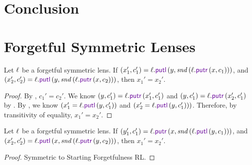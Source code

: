 \documentclass[acmsmall,screen,anonymous]{acmart}
\begin{document}

\section{Conclusion}
\label{sec:conc}

\begin{acks}
\end{acks}

\ifanon\else
\fi





\appendix

\ifappendices

\onecolumn

\section{Forgetful Symmetric Lenses}

\begin{property}
  \label{prop:forget-rl}
  Let $\mathit{\ell}$ be a forgetful symmetric lens.  If $(x_1',c_1') = \Lens.\PutL \App
  (y,\Snd \App (\Lens.\PutR \App (x,c_1)))$, and
  $(x_2',c_2') = \Lens.\PutL \App
  (y,\Snd \App (\Lens.\PutR \App (x,c_2)))$, then $x_1' = x_2'$.
\end{property}
\begin{proof}
  By \ForgetfulRL, $c_1' = c_2'$. We know $(y,c_1') = \Lens.\PutR \App
  (x_1',c_1')$ and $(y,c_1') = \Lens.\PutR \App (x_2',c_1')$ by \PutLR. By
  \PutRL, we know $(x_1' = \Lens.\PutL \App (y,c_1'))$ and $(x_2' = \Lens.\PutL
  \App (y,c_1')))$. Therefore, by transitivity of equality, $x_1' = x_2'$.
\end{proof}

\begin{property}
  \label{prop:forget-lr}
  Let $\mathit{\ell}$ be a forgetful symmetric lens.  If $(y_1',c_1') = \Lens.\PutR \App
  (x,\Snd \App (\Lens.\PutL \App (y,c_1)))$, and
  $(x_2',c_2') = \Lens.\PutL \App
  (x,\Snd \App (\Lens.\PutR \App (y,c_2)))$,
  then $x_1' = x_2'$.
\end{property}
\begin{proof}
  Symmetric to Starting Forgetfulness RL.
\end{proof}
\end{document}
